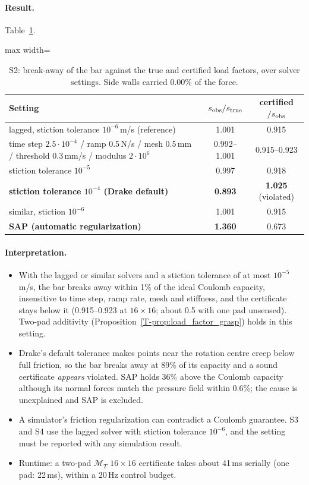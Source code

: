 \documentclass[11pt,a4paper]{article}
\newcommand{\M}{\mathcal M}
\newcommand{\T}[1]{\ref{T-#1}}                       %
\begin{document}
\paragraph{Result.} Table~\ref{tab:S2}.

\begin{table}[tbp]
\centering\small
\begin{adjustbox}{max width=\linewidth}\begin{tabular}{@{}lcc@{}}
\toprule
Setting & $s_{\rm obs}/s_{\rm true}$ & certified $/s_{\rm obs}$ \\
\midrule
lagged, stiction tolerance $10^{-6}$\,m/s (reference) & 1.001 & 0.915 \\
time step $2.5\cdot10^{-4}$ / ramp 0.5\,N/s / mesh 0.5\,mm / threshold 0.3\,mm/s / modulus $2\cdot10^6$ & 0.992--1.001 & 0.915--0.923 \\
stiction tolerance $10^{-5}$ & 0.997 & 0.918 \\
\textbf{stiction tolerance $10^{-4}$ (Drake default)} & \textbf{0.893} & \textbf{1.025} (violated) \\
similar, stiction $10^{-6}$ & 1.001 & 0.915 \\
\textbf{SAP (automatic regularization)} & \textbf{1.360} & 0.673 \\
\bottomrule
\end{tabular}\end{adjustbox}
\caption{S2: break-away of the bar against the true and certified load factors, over solver settings. Side walls carried 0.00\% of the force.}
\label{tab:S2}
\end{table}
\paragraph{Interpretation.}
\begin{itemize}
    \item With the lagged or similar solvers and a stiction tolerance of at most $10^{-5}$\,m/s, the bar breaks away within 1\% of the ideal Coulomb
    capacity, insensitive to time step, ramp rate, mesh and stiffness, and the certificate stays below it (0.915--0.923 at $16\times16$; about
    0.5 with one pad unsensed). Two-pad additivity (Proposition~\T{prop:load_factor_grasp}) holds in this setting.
    \item Drake's default tolerance makes points near the rotation centre creep below full friction, so the bar breaks away at 89\% of its
    capacity and a sound certificate \emph{appears} violated. SAP holds 36\% above the Coulomb capacity although its normal forces match the
    pressure field within 0.6\%; the cause is unexplained and SAP is excluded.
    \item A simulator's friction regularization can contradict a Coulomb guarantee. S3 and S4 use the lagged solver with stiction tolerance
    $10^{-6}$, and the setting must be reported with any simulation result.
    \item Runtime: a two-pad $\M_T$ $16\times16$ certificate takes about 41\,ms serially (one pad: 22\,ms), within a 20\,Hz control budget.
\end{itemize}
\end{document}
